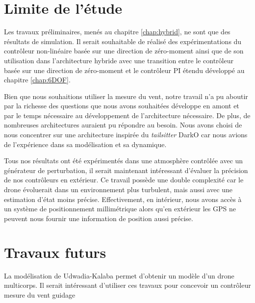 {\section*{Limite de l'étude}
Les travaux préliminaires, menés au chapitre \ref{chap:hybrid}, ne sont que des résultats de simulation. Il serait souhaitable de réalisé des expérimentations du contrôleur non-linéaire basée sur une direction de zéro-moment ainsi que de son utilisation dans l'architecture hybride avec une transition entre le contrôleur basée sur une direction de zéro-moment et le contrôleur PI étendu développé au chapitre \ref{chap:6DOF}.

Bien que nous souhaitions utiliser la mesure du vent, notre travail n'a pu aboutir par la richesse des questions que nous avons souhaitées développe en amont et par le temps nécessaire au développement de l'architecture nécessaire.
De plus, de nombreuses architectures auraient pu répondre au besoin. Nous avons choisi de nous concentrer sur une architecture inspirée du \textit{tailsitter} DarkO car nous avions de l'expérience dans sa modélisation et sa dynamique.

Tous nos résultats ont été expérimentés dans une atmosphère contrôlée avec un générateur de perturbation, il serait maintenant intéressant d'évaluer la précision de nos contrôleurs en extérieur. Ce travail possède une double complexité car le drone évoluerait dans un environnement plus turbulent, mais aussi avec une estimation d'état moins précise. Effectivement, en intérieur, nous avons accès à un système de positionnement millimétrique alors qu'en extérieur les GPS ne peuvent nous fournir une information de position aussi précise.


\section*{Travaux futurs}
{
    \color{green}
La modélisation de Udwadia-Kalaba permet d'obtenir un modèle d'un drone multicorps. Il serait intéressant d'utiliser ces travaux pour concevoir un contrôleur 
mesure du vent 
guidage 
}
}
